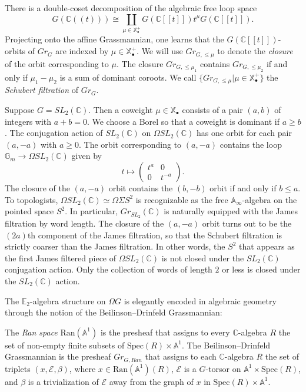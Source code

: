 There is a double-coset decomposition of the algebraic free loop space
$$
G(\mathbb{C}((t))) \cong \coprod_{\mu \in \mathbb{X}_{\bullet}^+} G(\mathbb{C}[[t]]) t^{\mu} G(\mathbb{C}[[t]]).
$$
Projecting onto the affine Grassmannian, one learns that the $G(\mathbb{C}[[t]])$-orbits of $Gr_G$ are indexed by $\mu \in \mathbb{X}_{\bullet}^+$.  We will use $Gr_{G,\le \mu}$ to denote the \textit{closure} of the orbit corresponding to $\mu$.  The closure $Gr_{G, \le \mu_1}$ contains $Gr_{G, \le \mu_2}$ if and only if $\mu_1-\mu_2$ is a sum of dominant coroots.  We call $\{Gr_{G,\le \mu}|\mu \in \mathbb{X}^+_{\bullet}\}$ the \textit{Schubert filtration} of $Gr_G$. 

\begin{exm} \label{sl2example}
Suppose $G=SL_2(\mathbb{C})$.  Then a coweight $\mu \in \mathbb{X}_\bullet$ consists of a pair $(a,b)$ of integers with $a+b=0$.  We choose a Borel so that a coweight is dominant if $a \ge b$.  The conjugation action of $SL_2(\mathbb{C})$ on $\Omega SL_2(\mathbb{C})$ has one orbit for each pair $(a,-a)$ with $a \ge 0$.  The orbit corresponding to $(a,-a)$ contains the loop $\mathbb{G}_m \rightarrow \Omega SL_2(\mathbb{C})$ given by
$$
t \mapsto \left( \begin{array}{cc} t^a & 0 \\ 0 & t^{-a}  \end{array} \right).
$$
The closure of the $(a,-a)$ orbit contains the $(b,-b)$ orbit if and only if $b \le a$.  To topologists, $\Omega SL_2(\mathbb{C}) \simeq \Omega \Sigma S^2$ is recognizable as the free $\mathbb{A}_\infty$-algebra on the pointed space $S^2$.  In particular, $Gr_{SL_2}(\mathbb{C})$ is naturally equipped with the James filtration by word length.  The closure of the $(a,-a)$ orbit turns out to be the $(2a)$th component of the James filtration, so that the Schubert filtration is strictly coarser than the James filtration.  In other words, the $S^2$ that appears as the first James filtered piece of $\Omega SL_2(\mathbb{C})$ is not closed under the $SL_2(\mathbb{C})$ conjugation action.  Only the collection of words of length $2$ or less is closed under the $SL_2(\mathbb{C})$ action. 
\end{exm}

The $\mathbb{E}_2$-algebra structure on $\Omega G$ is elegantly encoded in algebraic geometry through the notion of the Beilinson--Drinfeld Grassmannian:

\begin{dfn}
The \textit{Ran space} $\text{Ran}(\mathbb{A}^1)$ is the presheaf that assigns to every $\mathbb{C}$-algebra $R$ the set of non-empty finite subsets of $\text{Spec}(R) \times \mathbb{A}^1$.   The Beilinson--Drinfeld Grassmannian is the presheaf $Gr_{G,Ran}$ that assigns to each $\mathbb{C}$-algebra $R$ the set of triplets $(x,\mathcal{E},\beta)$, where $x \in \text{Ran}(\mathbb{A}^1)(R)$, $\mathcal{E}$ is a $G$-torsor on $\mathbb{A}^1 \times \text{Spec}(R)$, and $\beta$ is a trivialization of $\mathcal{E}$ away from the graph of $x$ in $\text{Spec}(R) \times \mathbb{A}^1 $.
\end{dfn}

